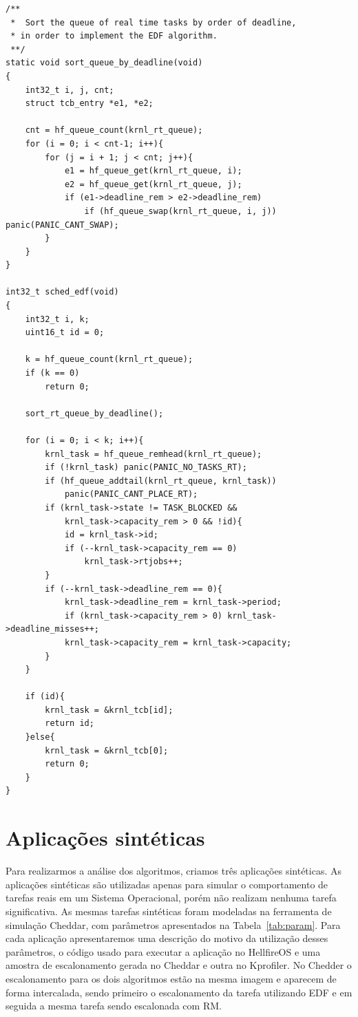\documentclass[12pt]{article}
\begin{document}
\begin{lstlisting}[showstringspaces=false]
/**
 *  Sort the queue of real time tasks by order of deadline,
 * in order to implement the EDF algorithm.
 **/
static void sort_queue_by_deadline(void)
{
    int32_t i, j, cnt;
    struct tcb_entry *e1, *e2;
    
    cnt = hf_queue_count(krnl_rt_queue);
    for (i = 0; i < cnt-1; i++){
        for (j = i + 1; j < cnt; j++){
            e1 = hf_queue_get(krnl_rt_queue, i);
            e2 = hf_queue_get(krnl_rt_queue, j);
            if (e1->deadline_rem > e2->deadline_rem)
                if (hf_queue_swap(krnl_rt_queue, i, j)) panic(PANIC_CANT_SWAP);
        }
    }
}

int32_t sched_edf(void)
{
    int32_t i, k;
    uint16_t id = 0;
    
    k = hf_queue_count(krnl_rt_queue);
    if (k == 0)
        return 0;
    
    sort_rt_queue_by_deadline();
    
    for (i = 0; i < k; i++){
        krnl_task = hf_queue_remhead(krnl_rt_queue);
        if (!krnl_task) panic(PANIC_NO_TASKS_RT);
        if (hf_queue_addtail(krnl_rt_queue, krnl_task))
            panic(PANIC_CANT_PLACE_RT);
        if (krnl_task->state != TASK_BLOCKED &&
            krnl_task->capacity_rem > 0 && !id){
            id = krnl_task->id;
            if (--krnl_task->capacity_rem == 0)
                krnl_task->rtjobs++;
        }
        if (--krnl_task->deadline_rem == 0){
            krnl_task->deadline_rem = krnl_task->period;
            if (krnl_task->capacity_rem > 0) krnl_task->deadline_misses++;
            krnl_task->capacity_rem = krnl_task->capacity;
        }
    }
    
    if (id){
        krnl_task = &krnl_tcb[id];
        return id;
    }else{
        krnl_task = &krnl_tcb[0];
        return 0;
    }
}
\end{lstlisting}


\section{Aplicações sintéticas}
Para realizarmos a análise dos algoritmos, criamos  três aplicações sintéticas. As aplicações sintéticas são utilizadas apenas para simular o comportamento de tarefas reais em um Sistema Operacional, porém não realizam nenhuma tarefa significativa. As mesmas tarefas sintéticas foram modeladas na ferramenta de simulação Cheddar, com parâmetros apresentados na Tabela~\ref{tab:param}. Para cada aplicação apresentaremos uma descrição do motivo da utilização desses parâmetros, o código usado para executar a aplicação no HellfireOS e uma amostra de escalonamento gerada no Cheddar e outra no Kprofiler. No Chedder o escalonamento para os dois algoritmos estão na mesma imagem e aparecem de forma intercalada, sendo primeiro o escalonamento da tarefa utilizando EDF e em seguida a mesma tarefa sendo escalonada com RM.
\end{document}
